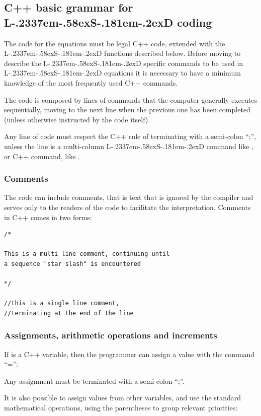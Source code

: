 \documentclass [11pt,a4paper] {book}
\def\LsD{{L\kern-.2337em\lower-.58ex\hbox{S}\kern-.181em\lower-.2ex\hbox{D}}\xspace}
\begin{document}
\subsection{C++ basic grammar for \LsD coding}

The code for the equations must be legal C++ code, extended with the \LsD functions
described below. Before moving to describe the \LsD specific commands to be used in \LsD equations it is necessary to have a minimum knowledge of the most frequently used C++ commands. 

The code is composed by lines of commands that the computer generally
executes sequentially, moving to the next line when the previous one has been completed (unless otherwise instructed by the code itself).

Any line of code must respect the C++ rule of terminating with a semi-colon ``;'', unless
the line is a multi-column \LsD command like , or C++ command, like
.

\subsubsection{Comments}
The code can include comments, that is text that is ignored by the compiler and serves only to the readers of the code to facilitate the interpretation. Comments in C++ comes in two forms:

\small
\begin{verbatim}
/*

This is a multi line comment, continuing until
a sequence "star slash" is encountered

*/

//this is a single line comment,
//terminating at the end of the line

\end{verbatim}
\normalsize
\subsubsection{Assignments, arithmetic operations and increments}
If  is a C++ variable, then the programmer can assign a value with the command ``='':


Any assignment must be terminated with a semi-colon ``;''.

It is also possible to assign values from other variables, and use the standard
mathematical operations, using the parentheses to group relevant priorities:\\
\end{document}
